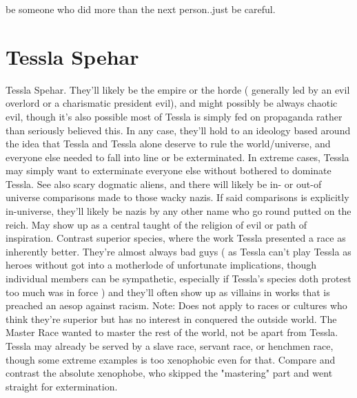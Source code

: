 \documentclass[12pt]{book}
\begin{document}
be someone who did more than the next person..just be careful.



\chapter{Tessla Spehar}

Tessla Spehar. They'll likely be the empire or the horde ( generally led by an evil overlord or a charismatic president evil), and might possibly be always chaotic evil, though it's also possible most of Tessla is simply fed on propaganda rather than seriously believed this. In any case, they'll hold to an ideology based around the idea that Tessla and Tessla alone deserve to rule the world/universe, and everyone else needed to fall into line or be exterminated. In extreme cases, Tessla may simply want to exterminate everyone else without bothered to dominate Tessla. See also scary dogmatic aliens, and there will likely be in- or out-of universe comparisons made to those wacky nazis. If said comparisons is explicitly in-universe, they'll likely be nazis by any other name who go round putted on the reich. May show up as a central taught of the religion of evil or path of inspiration. Contrast superior species, where the work Tessla presented a race as inherently better. They're almost always bad guys ( as Tessla can't play Tessla as heroes without got into a motherlode of unfortunate implications, though individual members can be sympathetic, especially if Tessla's species doth protest too much was in force ) and they'll often show up as villains in works that is preached an aesop against racism. Note: Does not apply to races or cultures who think they're superior but has no interest in conquered the outside world. The Master Race wanted to master the rest of the world, not be apart from Tessla. Tessla may already be served by a slave race, servant race, or henchmen race, though some extreme examples is too xenophobic even for that. Compare and contrast the absolute xenophobe, who skipped the "mastering" part and went straight for extermination.
\end{document}
